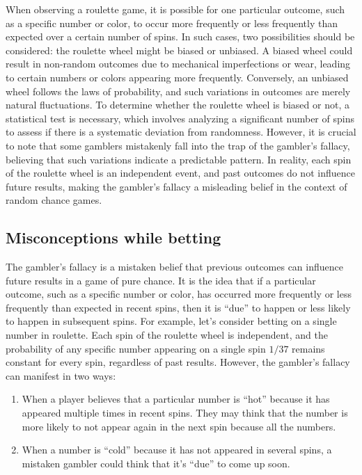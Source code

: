 \documentclass[11pt,twoside]{article}
\numberwithin{Theorem}{section}
\numberwithin{Definition}{section}
\numberwithin{Lemma}{section}
\numberwithin{Algorithm}{section}
\numberwithin{equation}{section}
\begin{document}
When observing a roulette game, it is possible for one particular outcome, such as a specific number or color, to occur more frequently or less frequently than expected over a certain number of spins. In such cases, two possibilities should be considered: the roulette wheel might be biased or unbiased. A biased wheel could result in non-random outcomes due to mechanical imperfections or wear, leading to certain numbers or colors appearing more frequently. Conversely, an unbiased wheel follows the laws of probability, and such variations in outcomes are merely natural fluctuations. To determine whether the roulette wheel is biased or not, a statistical test is necessary, which involves analyzing a significant number of spins to assess if there is a systematic deviation from randomness. However, it is crucial to note that some gamblers mistakenly fall into the trap of the gambler's fallacy, believing that such variations indicate a predictable pattern. In reality, each spin of the roulette wheel is an independent event, and past outcomes do not influence future results, making the gambler's fallacy a misleading belief in the context of random chance games.

\subsection{Misconceptions while betting}

The gambler's fallacy is a mistaken belief that previous outcomes can influence future results in a game of pure chance. It is the idea that if a particular outcome, such as a specific number or color, has occurred more frequently or less frequently than expected in recent spins, then it is “due” to happen or less likely to happen in subsequent spins. For example, let's consider betting on a single number in roulette. Each spin of the roulette wheel is independent, and the probability of any specific number appearing on a single spin $1/37$ remains constant for every spin, regardless of past results. However, the gambler's fallacy can manifest in two ways:
\begin{enumerate}
    \item When a player believes that a particular number is “hot” because it has appeared multiple times in recent spins. They may think that the number is more likely to not appear again in the next spin because all the numbers.
    \item When a number is “cold” because it has not appeared in several spins, a mistaken gambler could think that it's “due” to come up soon. 
\end{enumerate}
\end{document}
